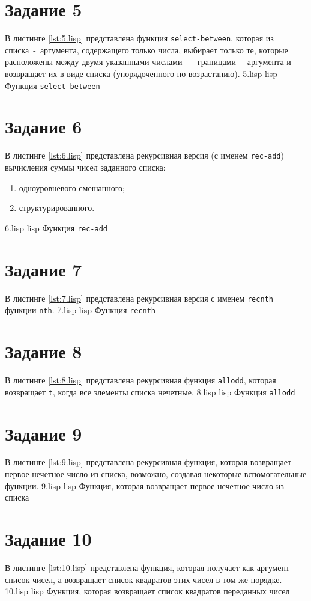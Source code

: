 \section{Задание 5}

В листинге \ref{lst:5.lisp} представлена функция \texttt{select-between}, которая из списка~-~аргумента, содержащего только числа, выбирает только те, которые расположены между двумя указанными числами~--- границами~-~аргумента и возвращает их в виде списка (упорядоченного по возрастанию).
	{5.lisp}
	{lisp}
	{Функция \texttt{select-between}}

\section{Задание 6}

В листинге \ref{lst:6.lisp} представлена рекурсивная версия (с именем \texttt{rec-add}) вычисления суммы чисел заданного списка:
\begin{enumerate}
	\item одноуровневого смешанного;
	\item структурированного.
\end{enumerate}
	{6.lisp}
	{lisp}
	{Функция \texttt{rec-add}}

\section{Задание 7}

В листинге \ref{lst:7.lisp} представлена рекурсивная версия с именем \texttt{recnth} функции \texttt{nth}.
	{7.lisp}
	{lisp}
	{Функция \texttt{recnth}}

\section{Задание 8}

В листинге \ref{lst:8.lisp} представлена рекурсивная функция \texttt{allodd}, которая возвращает \texttt{t}, когда все элементы списка нечетные.
	{8.lisp}
	{lisp}
	{Функция \texttt{allodd}}
	
\clearpage

\section{Задание 9}

В листинге \ref{lst:9.lisp} представлена рекурсивная функция, которая возвращает первое нечетное число из списка, возможно, создавая некоторые вспомогательные функции.
	{9.lisp}
	{lisp}
	{Функция, которая возвращает первое нечетное число из списка}

\section{Задание 10}

В листинге \ref{lst:10.lisp} представлена функция, которая получает как аргумент список чисел, а возвращает список квадратов этих чисел в том же порядке.
	{10.lisp}
	{lisp}
	{Функция, которая возвращает список квадратов переданных чисел}